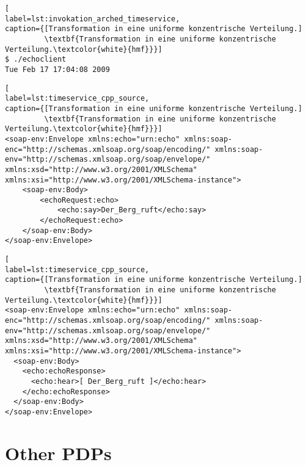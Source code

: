 \begin{minipage}[t]{\textwidth}
\begin{lstlisting}[
label=lst:invokation_arched_timeservice,
caption={[Transformation in eine uniforme konzentrische Verteilung.]
         \textbf{Transformation in eine uniforme konzentrische Verteilung.\textcolor{white}{hmf}}}]
$ ./echoclient
Tue Feb 17 17:04:08 2009
\end{lstlisting}
\end{minipage}





\begin{minipage}[t]{\textwidth}
\begin{lstlisting}[
label=lst:timeservice_cpp_source,
caption={[Transformation in eine uniforme konzentrische Verteilung.]
         \textbf{Transformation in eine uniforme konzentrische Verteilung.\textcolor{white}{hmf}}}]
<soap-env:Envelope xmlns:echo="urn:echo" xmlns:soap-enc="http://schemas.xmlsoap.org/soap/encoding/" xmlns:soap-env="http://schemas.xmlsoap.org/soap/envelope/" xmlns:xsd="http://www.w3.org/2001/XMLSchema" xmlns:xsi="http://www.w3.org/2001/XMLSchema-instance">
	<soap-env:Body>
		<echoRequest:echo>
			<echo:say>Der_Berg_ruft</echo:say>
		</echoRequest:echo>
	</soap-env:Body>
</soap-env:Envelope>
\end{lstlisting}
\end{minipage}


\begin{minipage}[t]{\textwidth}
\begin{lstlisting}[
label=lst:timeservice_cpp_source,
caption={[Transformation in eine uniforme konzentrische Verteilung.]
         \textbf{Transformation in eine uniforme konzentrische Verteilung.\textcolor{white}{hmf}}}]
<soap-env:Envelope xmlns:echo="urn:echo" xmlns:soap-enc="http://schemas.xmlsoap.org/soap/encoding/" xmlns:soap-env="http://schemas.xmlsoap.org/soap/envelope/" xmlns:xsd="http://www.w3.org/2001/XMLSchema" xmlns:xsi="http://www.w3.org/2001/XMLSchema-instance">
  <soap-env:Body>
    <echo:echoResponse>
      <echo:hear>[ Der_Berg_ruft ]</echo:hear>
    </echo:echoResponse>
  </soap-env:Body>
</soap-env:Envelope>
\end{lstlisting}
\end{minipage}





\section{Other PDPs}

